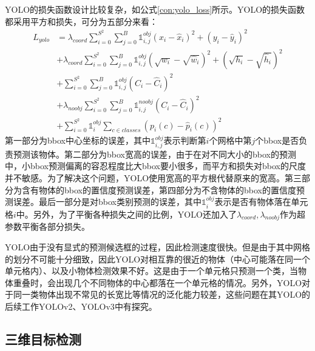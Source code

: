 YOLO的损失函数设计比较复杂，如公式\ref{con:yolo_loss}所示。YOLO的损失函数都采用平方和损失，可分为五部分来看：
\begin{equation}
\begin{split}
L_{yolo} &= \lambda_{coord} \sum^{S^2}_{i=0} \sum^{B}_{j=0} \mathds{1}^{obj}_{i,j} (x_i - \hat{x}_i)^2 + (y_i - \hat{y}_i)^2 \\
&+ \lambda_{coord} \sum^{S^2}_{i=0} \sum^{B}_{j=0} \mathds{1}^{obj}_{i,j} \left(\sqrt{w_i} - \sqrt{\hat{w}_i}\right)^2 + \left(\sqrt{h_i} - \sqrt{\hat{h}_i}\right)^2 \\
&+ \sum^{S^2}_{i=0} \sum^{B}_{j=0} \mathds{1}^{obj}_{i,j}\left(C_i -\hat{C}_i\right)^2\\
&+ \lambda_{noobj} \sum^{S^2}_{i=0} \sum^{B}_{j=0} \mathds{1}^{noobj}_{i,j}\left(C_i -\hat{C}_i\right)^2\\
&+ \sum^{S^2}_{i=0}\mathds{1}^{obj}_{i}\sum_{c \in classes} \left(p_i(c) - \hat{p}_i(c)\right)^2
\end{split}
\label{con:yolo_loss}
\end{equation}
第一部分为bbox中心坐标的误差，其中$\mathds{1}^{obj}_{i,j}$表示判断第$i$个网格中第$j$个bbox是否负责预测该物体。第二部分为bbox宽高的误差，由于在对不同大小的bbox的预测中，小bbox预测偏离的容忍程度比大bbox要小很多，而平方和损失对bbox的尺度并不敏感。为了解决这个问题，YOLO使用宽高的平方根代替原来的宽高。第三部分为含有物体的bbox的置信度预测误差，第四部分为不含物体的bbox的置信度预测误差。最后一部分是对bbox类别预测的误差，其中$\mathds{1}^{obj}_{i}$表示是否有物体落在单元格$i$中。另外，为了平衡各种损失之间的比例，YOLO还加入了$\lambda_{coord}, \lambda_{noobj}$作为超参数平衡各部分损失。

YOLO由于没有显式的预测候选框的过程，因此检测速度很快。但是由于其中网格的划分不可能十分细致，因此YOLO对相互靠的很近的物体（中心可能落在同一个单元格内）、以及小物体检测效果不好。这是由于一个单元格只预测一个类，当物体重叠时，会出现几个不同物体的中心都落在一个单元格的情况。另外，YOLO对于同一类物体出现不常见的长宽比等情况的泛化能力较差，这些问题在其YOLO的后续工作YOLOv2\cite{8100173}、YOLOv3\cite{RedmonYOLOv3}中有探究。

\subsection{三维目标检测}
\label{3d_detection}

